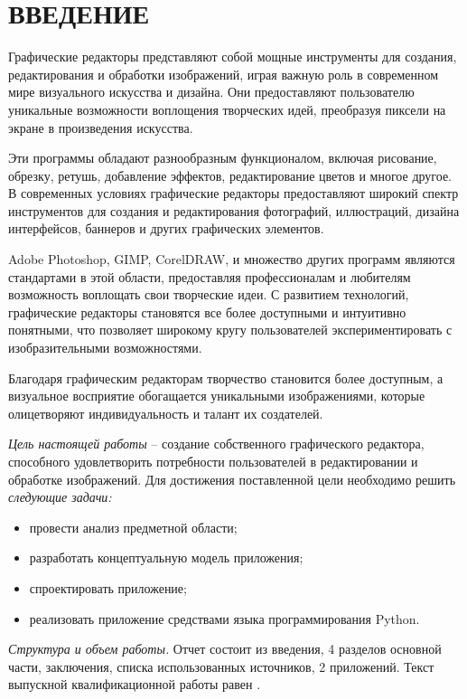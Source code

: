 \section*{ВВЕДЕНИЕ}

Графические редакторы представляют собой мощные инструменты для создания, редактирования и обработки изображений, играя важную роль в современном мире визуального искусства и дизайна. Они предоставляют пользователю уникальные возможности воплощения творческих идей, преобразуя пиксели на экране в произведения искусства.

Эти программы обладают разнообразным функционалом, включая рисование, обрезку, ретушь, добавление эффектов, редактирование цветов и многое другое. В современных условиях графические редакторы предоставляют широкий спектр инструментов для создания и редактирования фотографий, иллюстраций, дизайна интерфейсов, баннеров и других графических элементов.

Adobe Photoshop, GIMP, CorelDRAW, и множество других программ являются стандартами в этой области, предоставляя профессионалам и любителям возможность воплощать свои творческие идеи. С развитием технологий, графические редакторы становятся все более доступными и интуитивно понятными, что позволяет широкому кругу пользователей экспериментировать с изобразительными возможностями.

Благодаря графическим редакторам творчество становится более доступным, а визуальное восприятие обогащается уникальными изображениями, которые олицетворяют индивидуальность и талант их создателей.

\emph{Цель настоящей работы} – создание собственного графического редактора, способного удовлетворить потребности пользователей в редактировании и обработке изображений. Для достижения поставленной цели необходимо решить \emph{следующие задачи:}
\begin{itemize}
\item провести анализ предметной области;
\item разработать концептуальную модель приложения;
\item спроектировать приложение;
\item реализовать приложение средствами языка программирования Python.
\end{itemize}

\emph{Структура и объем работы.} Отчет состоит из введения, 4 разделов основной части, заключения, списка использованных источников, 2 приложений. Текст выпускной квалификационной работы равен .

